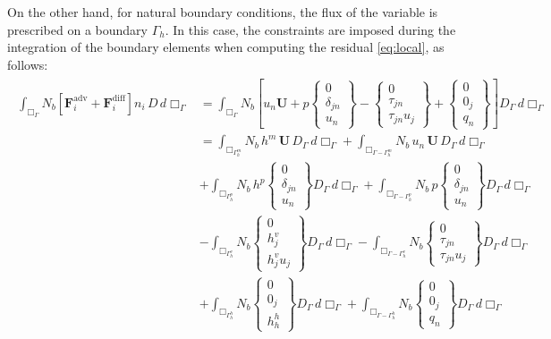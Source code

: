 \documentclass{ucb}
\begin{document}
On the other hand, for natural boundary conditions, the flux of the variable is prescribed on a boundary $\Gamma_h$. In this case, the constraints are imposed during the integration of the boundary elements when computing the residual \eqref{eq:local}, as follows:
\begin{multline}
    \begin{aligned}
        \int_{\Box_\Gamma} N_b\left[\bm{F}_i^\mathrm{adv} + \bm{F}_i^\mathrm{diff}\right] n_i \, D \, d\Box_\Gamma &= \int_{\Box_\Gamma} N_b \left[u_n\bm{U} + p\begin{Bmatrix}0 \\ \delta_{jn} \\ u_n\end{Bmatrix} - \begin{Bmatrix}0 \\ \tau_{jn} \\ \tau_{jn} u_j\end{Bmatrix} + \begin{Bmatrix}0 \\ 0_j \\ q_n\end{Bmatrix}\right] D_\Gamma \, d\Box_\Gamma \\
        &= \int_{\Box_{\Gamma_h^m}} N_b \, h^m \, \bm{U} \, D_\Gamma \, d\Box_\Gamma + \int_{\Box_{\Gamma-\Gamma_h^m}} N_b \, u_n \, \bm{U} \, D_\Gamma \, d\Box_\Gamma \\
        &+ \int_{\Box_{\Gamma_h^p}} N_b \, h^p \begin{Bmatrix}0 \\ \delta_{jn} \\ u_n\end{Bmatrix} D_\Gamma \, d\Box_\Gamma + \int_{\Box_{\Gamma-\Gamma_h^p}} N_b \, p \begin{Bmatrix}0 \\ \delta_{jn} \\ u_n\end{Bmatrix} D_\Gamma \, d\Box_\Gamma \\
        &- \int_{\Box_{\Gamma_h^v}} N_b \begin{Bmatrix}0 \\ h_j^v \\ h_j^v u_j\end{Bmatrix} D_\Gamma \, d\Box_\Gamma - \int_{\Box_{\Gamma-\Gamma_h^v}} N_b \begin{Bmatrix}0 \\ \tau_{jn} \\ \tau_{jn} u_j\end{Bmatrix} D_\Gamma \, d\Box_\Gamma \\
        &+ \int_{\Box_{\Gamma_h^h}} N_b \begin{Bmatrix}0 \\ 0_j \\ h_h^h\end{Bmatrix} D_\Gamma \, d\Box_\Gamma + \int_{\Box_{\Gamma-\Gamma_h^h}} N_b \begin{Bmatrix}0 \\ 0_j \\ q_n\end{Bmatrix} D_\Gamma \, d\Box_\Gamma
    \end{aligned}
\end{multline}
\end{document}
